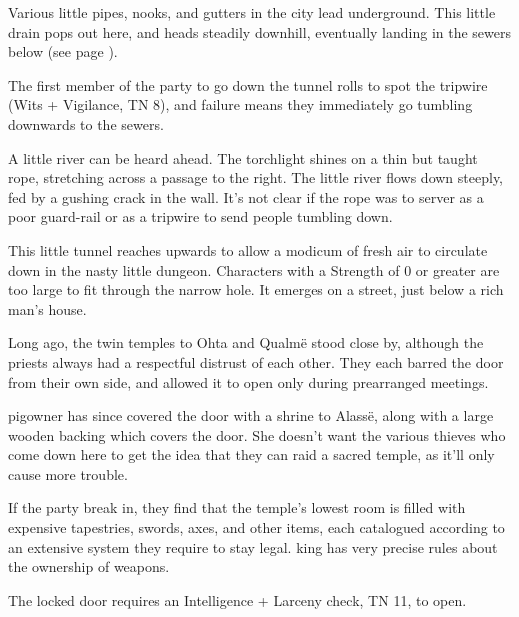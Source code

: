 \begin{multicols}{2}

\ghoul


Various little pipes, nooks, and gutters in the city lead underground.
This little drain pops out here, and heads steadily downhill, eventually landing in the sewers below (see page \pageref{slidein}).

The first member of the party to go down the tunnel rolls to spot the tripwire (Wits + Vigilance, TN 8), and failure means they immediately go tumbling downwards to the sewers.

\begin{boxtext}

	A little river can be heard ahead.
	The torchlight shines on a thin but taught rope, stretching across a passage to the right.
	The little river flows down steeply, fed by a gushing crack in the wall.
	It's not clear if the rope was to server as a poor guard-rail or as a tripwire to send people tumbling down.

\end{boxtext}


This little tunnel reaches upwards to allow a modicum of fresh air to circulate down in the nasty little dungeon.  Characters with a Strength of 0 or greater are too large to fit through the narrow hole.  It emerges on a street, just below a rich man's house.

Long ago, the twin temples to Ohta and Qualm\"{e} stood close by, although the priests always had a respectful distrust of each other.
They each barred the door from their own side, and allowed it to open only during prearranged meetings.

\Gls{pigowner} has since covered the door with a shrine to Alass\"{e}, along with a large wooden backing which covers the door.  She doesn't want the various thieves who come down here to get the idea that they can raid a sacred temple, as it'll only cause more trouble.

If the party break in, they find that the temple's lowest room is filled with expensive tapestries, swords, axes, and other items, each catalogued according to an extensive system they require to stay legal.  \Gls{king} has very precise rules about the ownership of weapons.

The locked door requires an Intelligence + Larceny check, TN 11, to open.


\end{multicols}
